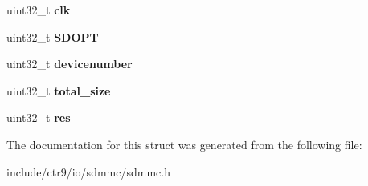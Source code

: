 \begin{DoxyCompactItemize}
\item 
uint32\+\_\+t {\bfseries clk}\hypertarget{structmmcdevice_a456df07c8288a7efe60c46bbe0989b63}{}\label{structmmcdevice_a456df07c8288a7efe60c46bbe0989b63}

\item 
uint32\+\_\+t {\bfseries S\+D\+O\+PT}\hypertarget{structmmcdevice_a73be5e38896b7c54cbfd14122e44d3ae}{}\label{structmmcdevice_a73be5e38896b7c54cbfd14122e44d3ae}

\item 
uint32\+\_\+t {\bfseries devicenumber}\hypertarget{structmmcdevice_ad2ba9df14cc87e64eb882c0378800bff}{}\label{structmmcdevice_ad2ba9df14cc87e64eb882c0378800bff}

\item 
uint32\+\_\+t {\bfseries total\+\_\+size}\hypertarget{structmmcdevice_a0add2da23fb547726b2063e25891c02a}{}\label{structmmcdevice_a0add2da23fb547726b2063e25891c02a}

\item 
uint32\+\_\+t {\bfseries res}\hypertarget{structmmcdevice_a246b2faa949b63f000b84252283533be}{}\label{structmmcdevice_a246b2faa949b63f000b84252283533be}

\end{DoxyCompactItemize}


The documentation for this struct was generated from the following file\+:\begin{DoxyCompactItemize}
\item 
include/ctr9/io/sdmmc/sdmmc.\+h\end{DoxyCompactItemize}
